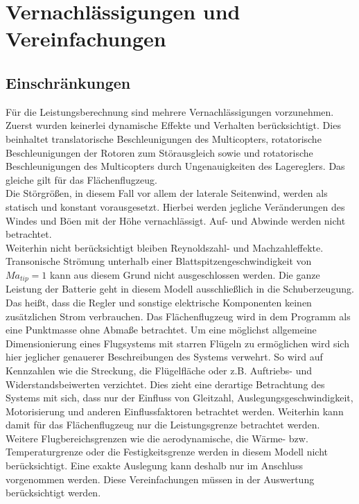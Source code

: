 \section{Vernachlässigungen und Vereinfachungen}
\label{sec:vernachlaessigungen_vereinfachungen}

\subsection{Einschränkungen}
Für die Leistungsberechnung sind mehrere Vernachlässigungen vorzunehmen. Zuerst wurden keinerlei dynamische Effekte und Verhalten berücksichtigt. Dies beinhaltet translatorische Beschleunigungen des Multicopters, rotatorische Beschleunigungen der Rotoren zum Störausgleich sowie und rotatorische Beschleunigungen des Multicopters durch Ungenauigkeiten des Lagereglers. Das gleiche gilt für das Flächenflugzeug. \\
Die Störgrößen, in diesem Fall vor allem der laterale Seitenwind, werden als statisch und konstant vorausgesetzt. Hierbei werden jegliche Veränderungen des Windes und Böen mit der Höhe vernachlässigt. Auf- und Abwinde werden nicht betrachtet. \\
Weiterhin nicht berücksichtigt bleiben Reynoldszahl- und Machzahleffekte. Transonische Strömung unterhalb einer Blattspitzengeschwindigkeit von \ensuremath{Ma_{tip}=1} kann aus diesem Grund nicht ausgeschlossen werden.
Die ganze Leistung der Batterie geht in diesem Modell ausschließlich in die Schuberzeugung. Das heißt, dass die Regler und sonstige elektrische Komponenten keinen zusätzlichen Strom verbrauchen.
Das Flächenflugzeug wird in dem Programm als eine Punktmasse ohne Abmaße betrachtet. Um eine möglichst allgemeine Dimensionierung eines Flugsystems mit starren Flügeln zu ermöglichen wird sich hier jeglicher genauerer Beschreibungen des Systems verwehrt. So wird auf Kennzahlen wie die Streckung, die Flügelfläche oder z.B. Auftriebs- und Widerstandsbeiwerten verzichtet. Dies zieht eine derartige Betrachtung des Systems mit sich, dass nur der Einfluss von Gleitzahl, Auslegungsgeschwindigkeit, Motorisierung und anderen Einflussfaktoren betrachtet werden. Weiterhin kann damit für das Flächenflugzeug nur die Leistungsgrenze betrachtet werden. Weitere Flugbereichsgrenzen wie die aerodynamische, die Wärme- bzw. Temperaturgrenze oder die Festigkeitsgrenze werden in diesem Modell nicht berücksichtigt. 
Eine exakte Auslegung kann deshalb nur im Anschluss vorgenommen werden. Diese Vereinfachungen müssen in der Auswertung berücksichtigt werden.

